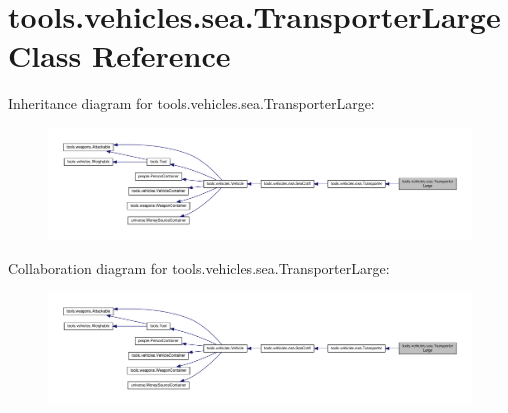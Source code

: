 \hypertarget{classtools_1_1vehicles_1_1sea_1_1_transporter_large}{}\section{tools.\+vehicles.\+sea.\+Transporter\+Large Class Reference}
\label{classtools_1_1vehicles_1_1sea_1_1_transporter_large}


Inheritance diagram for tools.\+vehicles.\+sea.\+Transporter\+Large\+:
\nopagebreak
\begin{figure}[H]
\begin{center}
\leavevmode
\includegraphics[width=350pt]{classtools_1_1vehicles_1_1sea_1_1_transporter_large__inherit__graph}
\end{center}
\end{figure}


Collaboration diagram for tools.\+vehicles.\+sea.\+Transporter\+Large\+:
\nopagebreak
\begin{figure}[H]
\begin{center}
\leavevmode
\includegraphics[width=350pt]{classtools_1_1vehicles_1_1sea_1_1_transporter_large__coll__graph}
\end{center}
\end{figure}
